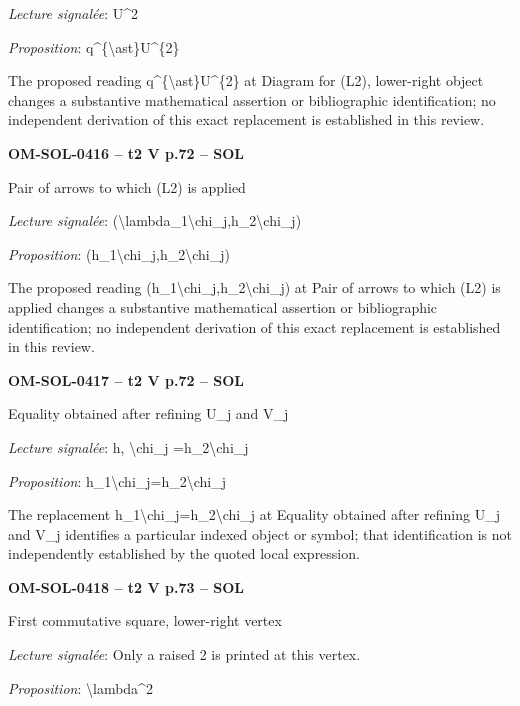 \emph{Lecture signalée}: U\textasciicircum{}2\par
\emph{Proposition}: q\textasciicircum{}\{\textbackslash{}ast\}U\textasciicircum{}\{2\}\par
The proposed reading q\textasciicircum{}\{\textbackslash{}ast\}U\textasciicircum{}\{2\} at Diagram for (L2), lower-right object changes a substantive mathematical assertion or bibliographic identification; no independent derivation of this exact replacement is established in this review.\par
\par\noindent\textbf{OM-SOL-0416 -- t2 V p.72 -- SOL}\par
Pair of arrows to which (L2) is applied\par
\emph{Lecture signalée}: (\textbackslash{}lambda\_1\textbackslash{}chi\_j,h\_2\textbackslash{}chi\_j)\par
\emph{Proposition}: (h\_1\textbackslash{}chi\_j,h\_2\textbackslash{}chi\_j)\par
The proposed reading (h\_1\textbackslash{}chi\_j,h\_2\textbackslash{}chi\_j) at Pair of arrows to which (L2) is applied changes a substantive mathematical assertion or bibliographic identification; no independent derivation of this exact replacement is established in this review.\par
\par\noindent\textbf{OM-SOL-0417 -- t2 V p.72 -- SOL}\par
Equality obtained after refining U\_j and V\_j\par
\emph{Lecture signalée}: h, \textbackslash{}chi\_j =\allowbreak  h\_2\textbackslash{}chi\_j\par
\emph{Proposition}: h\_1\textbackslash{}chi\_j=\allowbreak h\_2\textbackslash{}chi\_j\par
The replacement h\_1\textbackslash{}chi\_j=\allowbreak h\_2\textbackslash{}chi\_j at Equality obtained after refining U\_j and V\_j identifies a particular indexed object or symbol; that identification is not independently established by the quoted local expression.\par
\par\noindent\textbf{OM-SOL-0418 -- t2 V p.73 -- SOL}\par
First commutative square, lower-right vertex\par
\emph{Lecture signalée}: Only a raised 2 is printed at this vertex.\par
\emph{Proposition}: \textbackslash{}lambda\textasciicircum{}2\par
